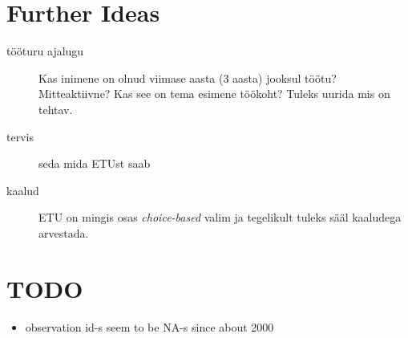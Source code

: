 \documentclass[a4paper]{article}
\begin{document}
\section{Further Ideas}

\begin{description}
\item[tööturu ajalugu] Kas inimene on olnud viimase aasta (3 aasta)
  jooksul töötu?  Mitteaktiivne?  Kas see on tema esimene töökoht?
  Tuleks uurida mis on tehtav.

\item[tervis] seda mida ETUst saab

\item[kaalud] ETU on mingis osas \emph{choice-based} valim ja
  tegelikult tuleks sääl kaaludega arvestada.
\end{description}


\section{TODO}
\label{sec:todo}

\begin{itemize}
\item observation id-s seem to be NA-s since about 2000
\end{itemize}
\end{document}
